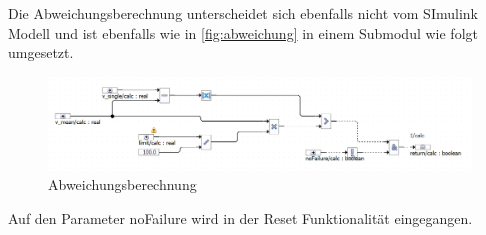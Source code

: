 Die Abweichungsberechnung unterscheidet sich ebenfalls nicht vom SImulink Modell und ist ebenfalls wie in \autoref{fig:abweichung} in einem Submodul wie folgt umgesetzt.
\begin{figure}[H]
	\centering
	\includegraphics[width=\linewidth]{../Graphiken/devCalc}
	\caption{Abweichungsberechnung}
	\label{fig:devCalc}
\end{figure}
Auf den Parameter noFailure wird in der Reset Funktionalität eingegangen.






